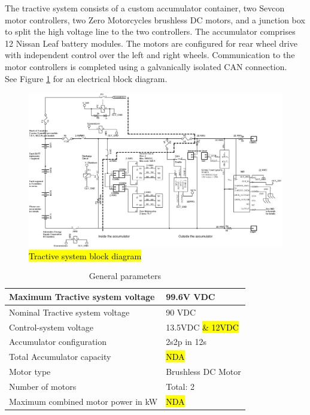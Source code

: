 \documentclass{article}
\DeclareRobustCommand{\hlr}[1]{{\sethlcolor{red}\hl{#1}}}
\begin{document}
    The tractive system consists of a custom accumulator container, two Sevcon motor controllers, two Zero Motorcycles brushless DC motors, and a junction box to split the high voltage line to the two controllers. The accumulator comprises 12 Nissan Leaf battery modules. The motors are configured for rear wheel drive with independent control over the left and right wheels. Communication to the motor controllers is completed using a galvanically isolated CAN connection.\\
    
    See Figure \ref{tractive} for an electrical block diagram.
    
        \begin{figure}
            \includegraphics[width=\textheight]{tractiveblock}
            \caption{\hlr{Tractive system block diagram}}
            \label{tractive}
        \end{figure}

        \begin{table}[H]
            \centering
            \begin{tabular}{|l|l|}
            \hline
                Maximum Tractive system voltage & 99.6V VDC \\ \hline
                Nominal Tractive system voltage & 90 VDC \\ \hline
                Control-system voltage & 13.5VDC \hlr{\& 12VDC}\\ \hline
                Accumulator configuration & 2s2p in 12s \\ \hline
                Total Accumulator capacity & \hlr{NDA} \\ \hline
                Motor type & Brushless DC Motor \\ \hline
                Number of motors & Total: 2 \\ \hline
                Maximum combined motor power in kW & \hlr{NDA} \\ \hline
            \end{tabular}
            \caption{General parameters}
            \label{systemtable}
        \end{table}
\end{document}
